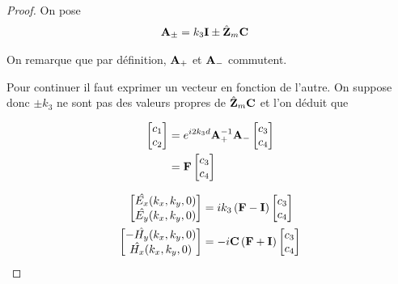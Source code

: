 \begin{proof}
            On pose
            \begin{align}
                \mathbf{A}_\pm &= k_3\mathbf{I} \pm \hat{\mathbf{Z}}_m\mathbf{C}
            \end{align}

            On remarque que par définition, $\mathbf{A}_+$ et $\mathbf{A}_-$ commutent.

            Pour continuer il faut exprimer un vecteur en fonction de l'autre. On suppose donc $\pm k_3$ ne sont pas des valeurs propres de $\hat{\mathbf{Z}}_m\mathbf{C}$ et l'on déduit que

            \begin{align}
                \begin{bmatrix}
                    c_1 \\
                    c_2
                \end{bmatrix}
                &= e^{i2 k_3 d} \mathbf{A}_+^{-1}\mathbf{A}_-
                \begin{bmatrix}
                    c_3 \\
                    c_4
                \end{bmatrix}
                \\
                & = \mathbf{F}
                \begin{bmatrix}
                    c_3 \\
                    c_4
                \end{bmatrix}
            \end{align}

            \begin{align}
                \begin{bmatrix}
                    \hat{E_x}(k_x,k_y,0)\\
                    \hat{E_y}(k_x,k_y,0)\\
                \end{bmatrix}
                &=ik_3\left(\mathbf{F} - \mathbf{I} \right)
                \begin{bmatrix}
                    c_3 \\
                    c_4
                \end{bmatrix}\\
                \begin{bmatrix}
                    -\hat{H_y}(k_x,k_y,0)\\
                    \hat{H_x}(k_x,k_y,0)\\
                \end{bmatrix}
                &=-i\mathbf{C} \left(\mathbf{F} + \mathbf{I} \right)
                \begin{bmatrix}
                        c_3 \\
                        c_4
                \end{bmatrix}
            \end{align}


\end{proof}
